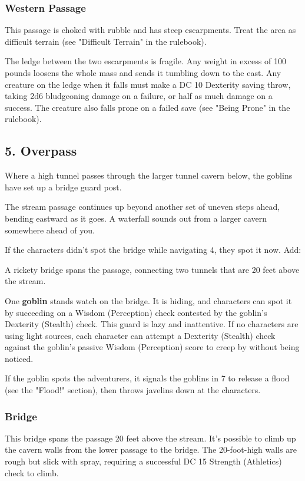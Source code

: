 \documentclass[10pt,a4paper,twoside,bg=print,twocolumn,openany,nodeprecatedcode]{dndbook}
\begin{document}
\subsubsection{Western Passage}
This passage is choked with rubble and has steep escarpments. Treat the area as difficult terrain (see "Difficult Terrain" in the rulebook).

The ledge between the two escarpments is fragile. Any weight in excess of 100 pounds loosens the whole mass and sends it tumbling down to the east. Any creature on the ledge when it falls must make a DC 10 Dexterity saving throw, taking 2d6 bludgeoning damage on a failure, or half as much damage on a success. The creature also falls prone on a failed save (see "Being Prone" in the rulebook).

\subsection{5. Overpass}
Where a high tunnel passes through the larger tunnel cavern below, the goblins have set up a bridge guard post.

\begin{DndReadAloud}{}
The stream passage continues up beyond another set of uneven steps ahead, bending eastward as it goes. A waterfall sounds out from a larger cavern somewhere ahead of you.

\end{DndReadAloud}

If the characters didn't spot the bridge while navigating 4, they spot it now. Add:

\begin{DndReadAloud}{}
A rickety bridge spans the passage, connecting two tunnels that are 20 feet above the stream.

\end{DndReadAloud}

One \textbf{goblin} stands watch on the bridge. It is hiding, and characters can spot it by succeeding on a Wisdom (Perception) check contested by the goblin's Dexterity (Stealth) check. This guard is lazy and inattentive. If no characters are using light sources, each character can attempt a Dexterity (Stealth) check against the goblin's passive Wisdom (Perception) score to creep by without being noticed.

If the goblin spots the adventurers, it signals the goblins in 7 to release a flood (see the "Flood!" section), then throws javelins down at the characters.

\subsubsection{Bridge}
This bridge spans the passage 20 feet above the stream. It's possible to climb up the cavern walls from the lower passage to the bridge. The 20-foot-high walls are rough but slick with spray, requiring a successful DC 15 Strength (Athletics) check to climb.
\end{document}
